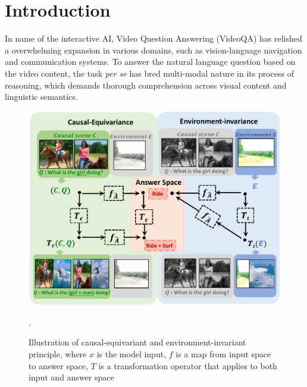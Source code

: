 \section{Introduction}
\label{sec:introduction}


In name of the interactive AI, Video Question Answering (VideoQA) \cite{fan2019heterogeneous} has relished a overwhelming expansion in various domains, such as vision-language navigation and communication systems. 
%
To answer the natural language question based on the video content, the task \textit{per se} has bred multi-modal nature in its process of reasoning, which demands thorough comprehension across visual content and linguistic semantics.

%

\begin{figure}[t]
\centering
\includegraphics[scale=0.53]{fig/f1.pdf}
\caption{Illustration of causal-equivariant and environment-invariant principle, where $x$ is the model input, $f$ is a map from input space to answer space, $T$ is a transformation operator that applies to both input and answer space}.
\vspace{-5pt}
\label{fig:overview}
\end{figure}

